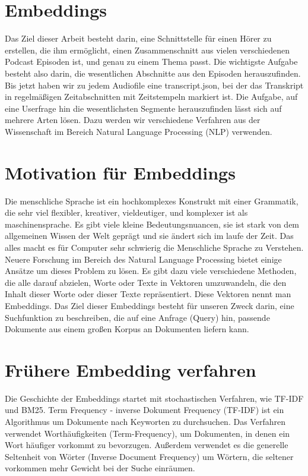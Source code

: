 \section{Embeddings}

Das Ziel dieser Arbeit besteht darin, eine Schnittstelle für einen Hörer zu erstellen, die ihm ermöglicht, einen Zusammenschnitt aus vielen verschiedenen Podcast Episoden ist, und genau zu einem Thema passt. 
Die wichtigste Aufgabe besteht also darin, die wesentlichen Abschnitte aus den Episoden herauszufinden. 
Bis jetzt haben wir zu jedem Audiofile eine transcript.json, bei der das Transkript in regelmäßigen Zeitabschnitten mit Zeitstempeln markiert ist. 
Die Aufgabe, auf eine Userfrage hin die wesentlichsten Segmente herauszufinden lässt sich auf mehrere Arten lösen. 
Dazu werden wir verschiedene Verfahren aus der Wissenschaft im Bereich Natural Language Processing (NLP) verwenden.

\section{Motivation für Embeddings}

Die menschliche Sprache ist ein hochkomplexes Konstrukt mit einer Grammatik, die sehr viel flexibler, kreativer, vieldeutiger, und komplexer ist als maschinensprache. 
Es gibt viele kleine Bedeutungsnuancen, sie ist stark von dem allgemeinen Wissen der Welt geprägt und sie ändert sich im laufe der Zeit. 
Das alles macht es für Computer sehr schwierig die Menschliche Sprache zu Verstehen. 
Neuere Forschung im Bereich des Natural Language Processing bietet einige Ansätze um dieses Problem zu lösen. 
Es gibt dazu viele verschiedene Methoden, die alle darauf abzielen, Worte oder Texte in Vektoren umzuwandeln, die den Inhalt dieser Worte oder dieser Texte repräsentiert.
Diese Vektoren nennt man Embeddings.
Das Ziel dieser Embeddings besteht für unseren Zweck darin, eine Suchfunktion zu beschreiben, die auf eine Anfrage (Query) hin, passende Dokumente aus einem großen Korpus an Dokumenten liefern kann.

\section{Frühere Embedding verfahren}

Die Geschichte der Embeddings startet mit stochastischen Verfahren, wie TF-IDF und BM25. 
Term Frequency - inverse Dokument Frequency (TF-IDF) ist ein Algorithmus um Dokumente nach Keyworten zu durchsuchen.
Das Verfahren verwendet Worthäufigkeiten (Term-Frequency), um Dokumenten, in denen ein Wort häufiger vorkommt zu bevorzugen.
Außerdem verwendet es die generelle Seltenheit von Wörter (Inverse Document Frequency) um Wörtern, die seltener vorkommen mehr Gewicht bei der Suche einräumen.

